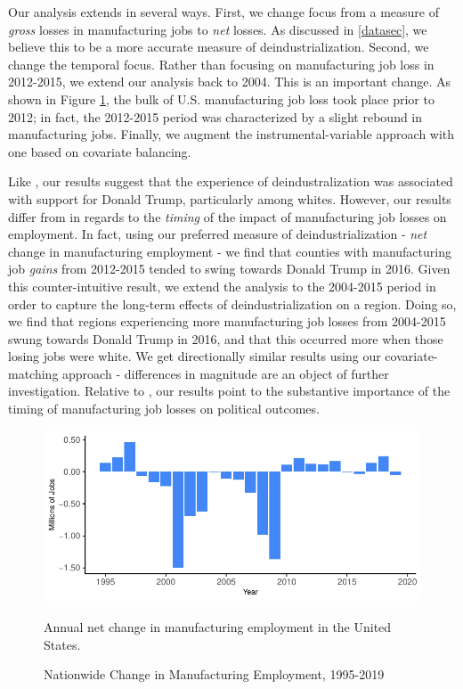 \documentclass[]{AEA}
\begin{document}
Our analysis extends \cite{Baccini21} in several ways. First, we change
focus from a measure of \emph{gross} losses in manufacturing jobs to
\emph{net} losses. As discussed in \ref{datasec}, we believe this to be
a more accurate measure of deindustrialization. Second, we change the
temporal focus. Rather than focusing on manufacturing job loss in
2012-2015, we extend our analysis back to 2004. This is an important
change. As shown in Figure \ref{natlPlotTS}, the bulk of U.S.
manufacturing job loss took place prior to 2012; in fact, the 2012-2015
period was characterized by a slight rebound in manufacturing jobs.
Finally, we augment the instrumental-variable approach with one based on
covariate balancing.

Like \cite{Baccini21}, our results suggest that the experience of
deindustralization was associated with support for Donald Trump,
particularly among whites. However, our results differ from
\cite{Baccini21} in regards to the \emph{timing} of the impact of
manufacturing job losses on employment. In fact, using our preferred
measure of deindustrialization - \emph{net} change in manufacturing
employment - we find that counties with manufacturing job \emph{gains}
from 2012-2015 tended to swing towards Donald Trump in 2016. Given this
counter-intuitive result, we extend the analysis to the 2004-2015 period
in order to capture the long-term effects of deindustrialization on a
region. Doing so, we find that regions experiencing more manufacturing
job losses from 2004-2015 swung towards Donald Trump in 2016, and that
this occurred more when those losing jobs were white. We get
directionally similar results using our covariate-matching approach -
differences in magnitude are an object of further investigation.
Relative to \cite{Baccini21}, our results point to the substantive
importance of the timing of manufacturing job losses on political
outcomes.

\FloatBarrier
\begin{figure}
\caption{Nationwide Change in Manufacturing Employment, 1995-2019}
\label{natlPlotTS}

\begin{center}\includegraphics{Final-Draft_files/figure-latex/unnamed-chunk-3-1} \end{center}



\FloatBarrier
\begin{figurenotes}
Annual net change in manufacturing employment in the United States. 
\end{figurenotes}
\end{figure}
\FloatBarrier
\end{document}
